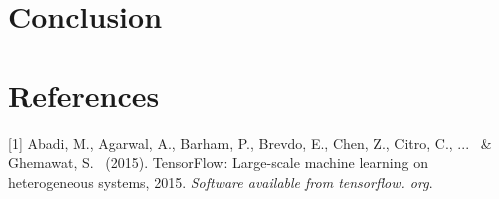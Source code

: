\documentclass{article}
\begin{document}
\section{Conclusion}


\section*{References}

\small

[1] Abadi, M., Agarwal, A., Barham, P., Brevdo, E., Chen, Z., Citro, C., ... \ \& Ghemawat, S. \ (2015). TensorFlow: Large-scale machine learning on heterogeneous systems, 2015. {\it Software available from tensorflow. org}.




\end{document}
